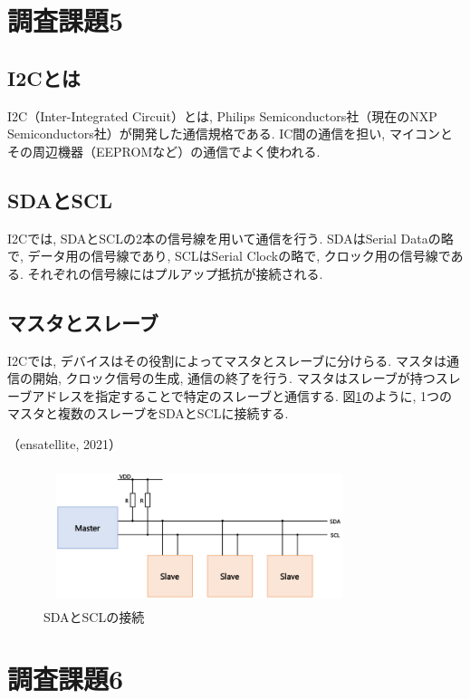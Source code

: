 \documentclass{ltjsarticle} %
\begin{document}
\section{調査課題5}

\subsection{I2Cとは}
I2C（Inter-Integrated Circuit）とは, Philips Semiconductors社（現在のNXP Semiconductors社）が開発した通信規格である. 
IC間の通信を担い, マイコンとその周辺機器（EEPROMなど）の通信でよく使われる. 

\subsection{SDAとSCL}
I2Cでは, SDAとSCLの2本の信号線を用いて通信を行う. 
SDAはSerial Dataの略で, データ用の信号線であり, SCLはSerial Clockの略で, クロック用の信号線である. 
それぞれの信号線にはプルアップ抵抗が接続される. 

\subsection{マスタとスレーブ}
I2Cでは, デバイスはその役割によってマスタとスレーブに分けらる. 
マスタは通信の開始, クロック信号の生成, 通信の終了を行う. 
マスタはスレーブが持つスレーブアドレスを指定することで特定のスレーブと通信する. 
図\ref{fig:fig1}のように, 1つのマスタと複数のスレーブをSDAとSCLに接続する. 

（ensatellite, 2021）

\begin{figure}[H] %
  \centering
  \includegraphics[width=0.8\textwidth]{fig1.png} %
  \caption{SDAとSCLの接続} %
  \label{fig:fig1} %
\end{figure}


\section{調査課題6}
\end{document}
